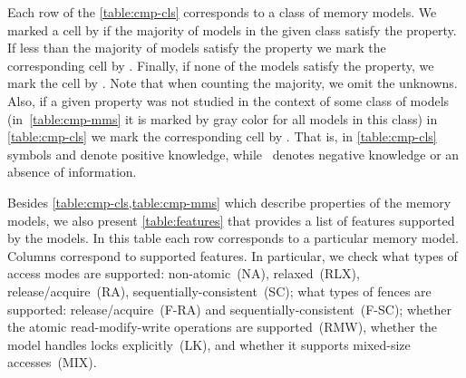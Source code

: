 Each row of the \cref{table:cmp-cls} corresponds to a class of memory models. 
We marked a cell by \cmark\xspace if the majority of models 
in the given class satisfy the property. 
If less than the majority of models satisfy the property we mark 
the corresponding cell by \wmark\xspace.
Finally, if none of the models satisfy the property, we mark the cell by \xmark\xspace. 
Note that when counting the majority, we omit the unknowns.
Also, if a given property was not studied in the context of some class of models 
(\ie in~\cref{table:cmp-mms} it is marked by gray color for all models in this class)
in \cref{table:cmp-cls} we mark the corresponding cell by \xmark. 
That is, in \cref{table:cmp-cls} symbols \cmark\xspace and \wmark\xspace 
denote positive knowledge,
while~\xmark\xspace denotes negative knowledge or
an absence of information.

Besides \cref{table:cmp-cls,table:cmp-mms} which describe 
properties of the memory models, 
we also present \cref{table:features}
that provides a list of features supported by the models.
In this table each row corresponds to a particular memory model. 
Columns correspond to supported features. 
In particular, we check what types of access modes are supported:
non-atomic~(NA), relaxed~(RLX), release/acquire~(RA), sequentially-consistent~(SC); 
what types of fences are supported: release/acquire~(F-RA) 
and sequentially-consistent~(F-SC);
whether the atomic read-modify-write operations are supported~(RMW),
whether the model handles locks explicitly~(LK),
and whether it supports mixed-size accesses~(MIX). 





